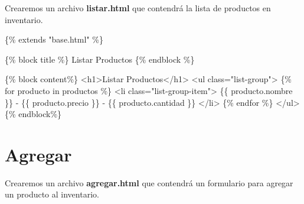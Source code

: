\documentclass[
  a4paper,
  DIV=11,
  numbers=noendperiod,
  onepage,
  openany]{scrreprt}
\newenvironment{Shaded}{\begin{snugshade}}{\end{snugshade}}
\newcommand{\DataTypeTok}[1]{\textcolor[rgb]{0.68,0.00,0.00}{#1}}
\newcommand{\KeywordTok}[1]{\textcolor[rgb]{0.00,0.23,0.31}{#1}}
\newcommand{\NormalTok}[1]{\textcolor[rgb]{0.00,0.23,0.31}{#1}}
\newcommand{\OperatorTok}[1]{\textcolor[rgb]{0.37,0.37,0.37}{#1}}
\newcommand{\OtherTok}[1]{\textcolor[rgb]{0.00,0.23,0.31}{#1}}
\newcommand{\StringTok}[1]{\textcolor[rgb]{0.13,0.47,0.30}{#1}}
\begin{document}
Crearemos un archivo \textbf{listar.html} que contendrá la lista de
productos en inventario.

\begin{Shaded}
\begin{Highlighting}[]
\NormalTok{\{\% extends "base.html" \%\}}

\NormalTok{\{\% block title \%\} Listar Productos \{\% endblock \%\}}

\NormalTok{\{\% block content\%\}}
\DataTypeTok{\textless{}}\KeywordTok{h1}\DataTypeTok{\textgreater{}}\NormalTok{Listar Productos}\DataTypeTok{\textless{}/}\KeywordTok{h1}\DataTypeTok{\textgreater{}}
\DataTypeTok{\textless{}}\KeywordTok{ul}\OtherTok{ class}\OperatorTok{=}\StringTok{"list{-}group"}\DataTypeTok{\textgreater{}}
\NormalTok{    \{\% for producto in productos \%\}}
    \DataTypeTok{\textless{}}\KeywordTok{li}\OtherTok{ class}\OperatorTok{=}\StringTok{"list{-}group{-}item"}\DataTypeTok{\textgreater{}} 
\NormalTok{        \{\{ producto.nombre \}\} {-} \{\{ producto.precio \}\} {-} \{\{ producto.cantidad \}\}}
    \DataTypeTok{\textless{}/}\KeywordTok{li}\DataTypeTok{\textgreater{}}
\NormalTok{    \{\% endfor \%\}}
\DataTypeTok{\textless{}/}\KeywordTok{ul}\DataTypeTok{\textgreater{}}
\NormalTok{\{\% endblock\%\}}
\end{Highlighting}
\end{Shaded}

\section{Agregar}\label{agregar}

Crearemos un archivo \textbf{agregar.html} que contendrá un formulario
para agregar un producto al inventario.
\end{document}
